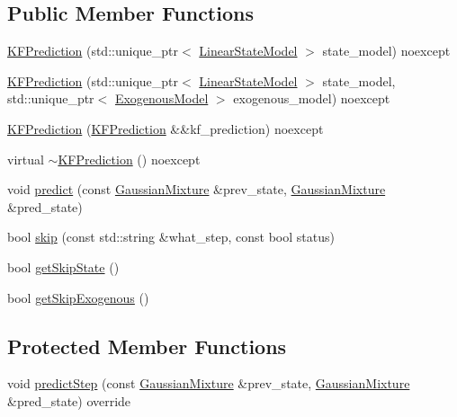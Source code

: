 \subsection*{Public Member Functions}
\begin{DoxyCompactItemize}
\item 
\mbox{\hyperlink{classbfl_1_1KFPrediction_a91e58a83fceb6fe2ec6ef9221ac1eef9}{K\+F\+Prediction}} (std\+::unique\+\_\+ptr$<$ \mbox{\hyperlink{classbfl_1_1LinearStateModel}{Linear\+State\+Model}} $>$ state\+\_\+model) noexcept
\item 
\mbox{\hyperlink{classbfl_1_1KFPrediction_a2fe62141dd9b689ad65b682bfa7f1482}{K\+F\+Prediction}} (std\+::unique\+\_\+ptr$<$ \mbox{\hyperlink{classbfl_1_1LinearStateModel}{Linear\+State\+Model}} $>$ state\+\_\+model, std\+::unique\+\_\+ptr$<$ \mbox{\hyperlink{classbfl_1_1ExogenousModel}{Exogenous\+Model}} $>$ exogenous\+\_\+model) noexcept
\item 
\mbox{\hyperlink{classbfl_1_1KFPrediction_a83a41dc6651592cdaccbd3fae8f3e0de}{K\+F\+Prediction}} (\mbox{\hyperlink{classbfl_1_1KFPrediction}{K\+F\+Prediction}} \&\&kf\+\_\+prediction) noexcept
\item 
virtual \mbox{\hyperlink{classbfl_1_1KFPrediction_a3096e280c098bab4fa6a7e3aa859f67f}{$\sim$\+K\+F\+Prediction}} () noexcept
\item 
void \mbox{\hyperlink{classbfl_1_1GaussianPrediction_a37195b6f9a8799ac3d357500b8142676}{predict}} (const \mbox{\hyperlink{classbfl_1_1GaussianMixture}{Gaussian\+Mixture}} \&prev\+\_\+state, \mbox{\hyperlink{classbfl_1_1GaussianMixture}{Gaussian\+Mixture}} \&pred\+\_\+state)
\item 
bool \mbox{\hyperlink{classbfl_1_1GaussianPrediction_ae647821cf920ea81f981ebc9260cdbe6}{skip}} (const std\+::string \&what\+\_\+step, const bool status)
\item 
bool \mbox{\hyperlink{classbfl_1_1GaussianPrediction_a6885530a677199241b2ac11ccdb09688}{get\+Skip\+State}} ()
\item 
bool \mbox{\hyperlink{classbfl_1_1GaussianPrediction_aaf3743111a493b90092b7ead9cbf7825}{get\+Skip\+Exogenous}} ()
\end{DoxyCompactItemize}
\subsection*{Protected Member Functions}
\begin{DoxyCompactItemize}
\item 
void \mbox{\hyperlink{classbfl_1_1KFPrediction_aa71d6b8ac030c54e86d3e91a94bb2db9}{predict\+Step}} (const \mbox{\hyperlink{classbfl_1_1GaussianMixture}{Gaussian\+Mixture}} \&prev\+\_\+state, \mbox{\hyperlink{classbfl_1_1GaussianMixture}{Gaussian\+Mixture}} \&pred\+\_\+state) override
\end{DoxyCompactItemize}
